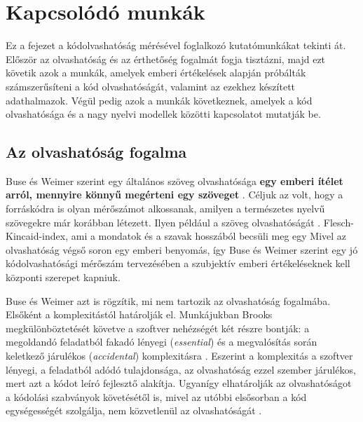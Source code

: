 \documentclass[
]{elteikthesis}[2024/04/26]
\begin{document}
\cleardoublepage











\chapter{Kapcsolódó munkák}
\label{ch:related}

Ez a fejezet a kódolvashatóság mérésével foglalkozó kutatómunkákat tekinti át.
Először az olvashatóság és az érthetőség fogalmát fogja tisztázni, majd ezt
követik azok a munkák, amelyek emberi értékelések alapján próbálták
számszerűsíteni a kód olvashatóságát, valamint az ezekhez készített
adathalmazok. Végül pedig azok a munkák következnek, amelyek a kód olvashatósága
és a nagy nyelvi modellek közötti kapcsolatot mutatják be.

\section{Az olvashatóság fogalma}
\label{sec:related:definition}

Buse és Weimer szerint egy általános szöveg olvashatósága \textbf{egy emberi
ítélet arról, mennyire könnyű megérteni egy szöveget} \cite{buse2008metric}.
Céljuk az volt, hogy a forráskódra is olyan mérőszámot alkossanak, amilyen a
természetes nyelvű szövegekre már korábban létezett. Ilyen például a szöveg
olvashatóságát \cite{kincaid1975derivation}. Flesch-Kincaid-index, ami a
mondatok és a szavak hosszából becsüli meg egy Mivel az olvashatóság végső soron
egy emberi benyomás, így Buse és Weimer szerint egy jó kódolvashatósági mérőszám
tervezésében a szubjektív emberi értékeléseknek kell központi szerepet kapniuk.

Buse és Weimer azt is rögzítik, mi nem tartozik az olvashatóság fogalmába.
Elsőként a komplexitástól határolják el. Munkájukban Brooks megkülönböztetését
követve a szoftver nehézségét két részre bontják: a megoldandó feladatból fakadó
lényegi (\textit{essential}) és a megvalósítás során keletkező járulékos
(\textit{accidental}) komplexitásra \cite{brooks1987nosilver}. Eszerint a
komplexitás a szoftver lényegi, a feladatból adódó tulajdonsága, az olvashatóság
ezzel szember járulékos, mert azt a kódot leíró fejlesztő alakítja. Ugyanígy
elhatárolják az olvashatóságot a kódolási szabványok követésétől is, mivel az
utóbbi elsősorban a kód egységességét szolgálja, nem közvetlenül az
olvashatóságát \cite{buse2010learning}.
\end{document}
